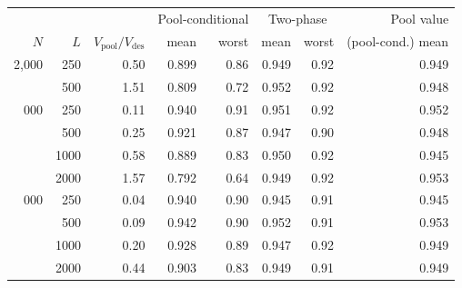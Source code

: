 \begin{tabular}{rr r rr rr r}\toprule
 & & & \multicolumn{2}{c}{Pool-conditional} & \multicolumn{2}{c}{Two-phase} & Pool value \\
$N$ & $L$ & $V_{\mathrm{pool}}/V_{\mathrm{des}}$ & mean & worst & mean & worst & (pool-cond.) mean \\\midrule
2{,}000 & 250 & 0.50 & 0.899 & 0.86 & 0.949 & 0.92 & 0.949 \\
 & 500 & 1.51 & 0.809 & 0.72 & 0.952 & 0.92 & 0.948 \\
\addlinespace
8{,}000 & 250 & 0.11 & 0.940 & 0.91 & 0.951 & 0.92 & 0.952 \\
 & 500 & 0.25 & 0.921 & 0.87 & 0.947 & 0.90 & 0.948 \\
 & 1000 & 0.58 & 0.889 & 0.83 & 0.950 & 0.92 & 0.945 \\
 & 2000 & 1.57 & 0.792 & 0.64 & 0.949 & 0.92 & 0.953 \\
\addlinespace
20{,}000 & 250 & 0.04 & 0.940 & 0.90 & 0.945 & 0.91 & 0.945 \\
 & 500 & 0.09 & 0.942 & 0.90 & 0.952 & 0.91 & 0.953 \\
 & 1000 & 0.20 & 0.928 & 0.89 & 0.947 & 0.92 & 0.949 \\
 & 2000 & 0.44 & 0.903 & 0.83 & 0.949 & 0.91 & 0.949 \\
\bottomrule\end{tabular}
